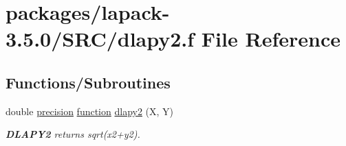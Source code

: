 \hypertarget{dlapy2_8f}{}\section{packages/lapack-\/3.5.0/\+S\+R\+C/dlapy2.f File Reference}
\label{dlapy2_8f}
\subsection*{Functions/\+Subroutines}
\begin{DoxyCompactItemize}
\item 
double \hyperlink{numinquire_8h_a2c8e616467665d0b2814d4c1589ba74e}{precision} \hyperlink{afunc_8m_a7b5e596df91eadea6c537c0825e894a7}{function} \hyperlink{group__auxOTHERauxiliary_gacf4c47c2f593fb3a4e842bca6df1240b}{dlapy2} (X, Y)
\begin{DoxyCompactList}\small\item\em {\bfseries D\+L\+A\+P\+Y2} returns sqrt(x2+y2). \end{DoxyCompactList}\end{DoxyCompactItemize}
